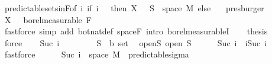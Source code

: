 \begin{isabellebody}
\ predictable{\isacharunderscore}{\kern0pt}sets{\isacharunderscore}{\kern0pt}in{\isacharunderscore}{\kern0pt}F{\isacharbrackleft}{\kern0pt}of\ {\isachardoublequoteopen}{\isasymlambda}i{\isachardot}{\kern0pt}\ if\ i\ {\isacharequal}{\kern0pt}\ {}\ then\ X\ {}\ {\isacharminus}{\kern0pt}{\isacharbackquote}{\kern0pt}\ S\ {\isasyminter}\ space\ M\ else\ {\isacharbraceleft}{\kern0pt}{\isacharbraceright}{\kern0pt}{\isachardoublequoteclose}{\isacharbrackright}{\kern0pt}\ \isamarkupfalse%
\ presburger\isanewline
\ \ \isacommand{{\isacharbraceright}{\kern0pt}}\isamarkupfalse%
\isanewline
\ \ \isamarkupfalse%
\ {\isachardoublequoteopen}X\ {}\ {\isasymin}\ borel{\isacharunderscore}{\kern0pt}measurable\ {\isacharparenleft}{\kern0pt}F\ {}{\isacharparenright}{\kern0pt}{\isachardoublequoteclose}\ \isamarkupfalse%
\ {\isacharparenleft}{\kern0pt}fastforce\ simp\ add{\isacharcolon}{\kern0pt}\ bot{\isacharunderscore}{\kern0pt}nat{\isacharunderscore}{\kern0pt}def\ space{\isacharunderscore}{\kern0pt}F\ intro{\isacharbang}{\kern0pt}{\isacharcolon}{\kern0pt}\ borel{\isacharunderscore}{\kern0pt}measurableI{\isacharparenright}{\kern0pt}\isanewline
\ \ \isamarkupfalse%
\ {\isacharquery}{\kern0pt}thesis\ \isamarkupfalse%
\ {}\ \isamarkupfalse%
\ force\isanewline
{}\isamarkupfalse%
\isanewline
\ \ \isamarkupfalse%
\ {\isacharparenleft}{\kern0pt}Suc\ i{\isacharparenright}{\kern0pt}\isanewline
\ \ \isacommand{{\isacharbraceleft}{\kern0pt}}\isamarkupfalse%
\isanewline
\ \ \ \ \isamarkupfalse%
\ S\ {\isacharcolon}{\kern0pt}{\isacharcolon}{\kern0pt}\ {\isachardoublequoteopen}{\isacharprime}{\kern0pt}b\ set{\isachardoublequoteclose}\ \isamarkupfalse%
\ open{\isacharunderscore}{\kern0pt}S{\isacharcolon}{\kern0pt}\ {\isachardoublequoteopen}open\ S{\isachardoublequoteclose}\isanewline
\ \ \ \ \isamarkupfalse%
\ {\isachardoublequoteopen}{\isacharbraceleft}{\kern0pt}Suc\ i{\isacharbraceright}{\kern0pt}\ {\isacharequal}{\kern0pt}\ {\isacharbraceleft}{\kern0pt}i{\isacharless}{\kern0pt}{\isachardot}{\kern0pt}{\isachardot}{\kern0pt}Suc\ i{\isacharbraceright}{\kern0pt}{\isachardoublequoteclose}\ \isamarkupfalse%
\ fastforce\isanewline
\ \ \ \ \isamarkupfalse%
\ {\isachardoublequoteopen}{\isacharbraceleft}{\kern0pt}Suc\ i{\isacharbraceright}{\kern0pt}\ {\isasymtimes}\ space\ M\ {\isasymin}\ predictable{\isacharunderscore}{\kern0pt}sigma{\isachardoublequoteclose}\ \isamarkupfalse%

\end{isabellebody}
